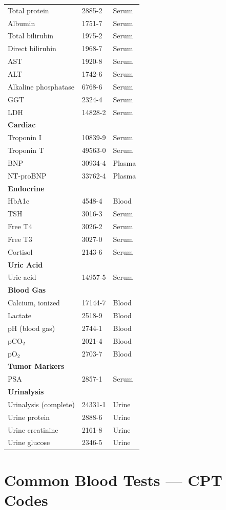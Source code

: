 \begin{longtable}{@{}p{5.5cm}p{2.5cm}p{2.2cm}@{}}
Total protein & 2885-2 & Serum \\
Albumin & 1751-7 & Serum \\
Total bilirubin & 1975-2 & Serum \\
Direct bilirubin & 1968-7 & Serum \\
AST & 1920-8 & Serum \\
ALT & 1742-6 & Serum \\
Alkaline phosphatase & 6768-6 & Serum \\
GGT & 2324-4 & Serum \\
LDH & 14828-2 & Serum \\
\textbf{Cardiac} & & \\
Troponin I & 10839-9 & Serum \\
Troponin T & 49563-0 & Serum \\
BNP & 30934-4 & Plasma \\
NT-proBNP & 33762-4 & Plasma \\
\textbf{Endocrine} & & \\
HbA1c & 4548-4 & Blood \\
TSH & 3016-3 & Serum \\
Free T4 & 3026-2 & Serum \\
Free T3 & 3027-0 & Serum \\
Cortisol & 2143-6 & Serum \\
\textbf{Uric Acid} & & \\
Uric acid & 14957-5 & Serum \\
\textbf{Blood Gas} & & \\
Calcium, ionized & 17144-7 & Blood \\
Lactate & 2518-9 & Blood \\
pH (blood gas) & 2744-1 & Blood \\
pCO$_2$ & 2021-4 & Blood \\
pO$_2$ & 2703-7 & Blood \\
\textbf{Tumor Markers} & & \\
PSA & 2857-1 & Serum \\
\textbf{Urinalysis} & & \\
Urinalysis (complete) & 24331-1 & Urine \\
Urine protein & 2888-6 & Urine \\
Urine creatinine & 2161-8 & Urine \\
Urine glucose & 2346-5 & Urine \\
\bottomrule
\end{longtable}

\clearpage
\section{Common Blood Tests --- CPT Codes}

